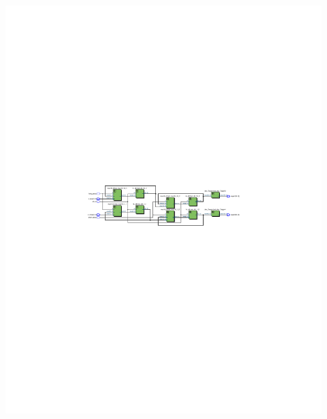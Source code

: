 \documentclass[FM,ZP]{tulthesis}
\begin{document}
	\includegraphics[clip,width=0.9\textwidth]{display_memory.pdf}
\end{document}

